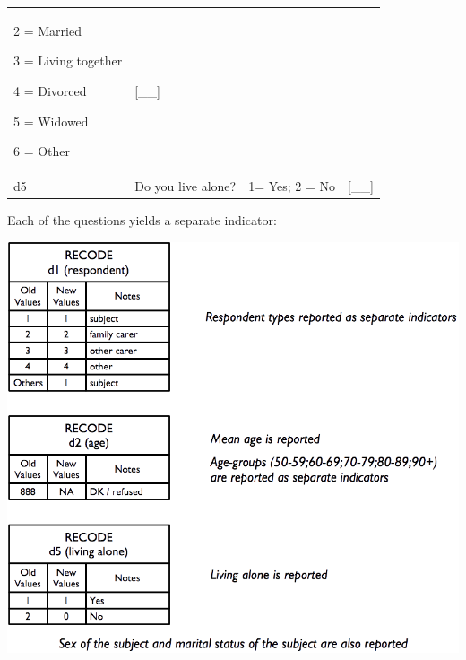 \documentclass[12pt,a4paper]{book}
\theoremstyle{definition}
\theoremstyle{definition}
\theoremstyle{definition}
\theoremstyle{remark}
\begin{document}
\begin{longtable}[]{@{}llll@{}}
\begin{minipage}[t]{0.24\columnwidth}
2 = Married

3 = Living together

4 = Divorced

5 = Widowed

6 = Other\strut
\end{minipage} & \begin{minipage}[t]{0.24\columnwidth}\raggedright
{[}\_\_{]}\strut
\end{minipage}\tabularnewline
\begin{minipage}[t]{0.10\columnwidth}\raggedright
d5\strut
\end{minipage} & \begin{minipage}[t]{0.34\columnwidth}\raggedright
Do you live alone?\strut
\end{minipage} & \begin{minipage}[t]{0.29\columnwidth}\raggedright
1= Yes; 2 = No\strut
\end{minipage} & \begin{minipage}[t]{0.15\columnwidth}\raggedright
{[}\_\_{]}\strut
\end{minipage}\tabularnewline
\bottomrule
\end{longtable}

Each of the questions yields a separate indicator:

\begin{center}\includegraphics{figures/indicators03} \end{center}
\end{document}
